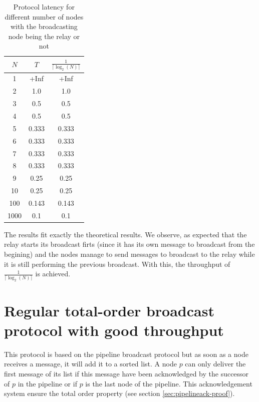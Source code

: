\documentclass[a4paper]{article}
\begin{document}
\begin{table}[H]
\centering
\begin{tabular}{|c|c|c|}
    \hline
    $N$   & $T$  & $\frac{1}{\lceil\log_2(N)\rceil}$ \\
    \hline
    1     & +Inf   & +Inf   \\
    2     & 1.0    & 1.0    \\
    3     & 0.5    & 0.5    \\
    4     & 0.5    & 0.5    \\
    5     & 0.333  & 0.333  \\
    6     & 0.333  & 0.333  \\
    7     & 0.333  & 0.333  \\
    8     & 0.333  & 0.333  \\
    9     & 0.25   & 0.25   \\
    10    & 0.25   & 0.25   \\
    100   & 0.143  & 0.143  \\
    1000  & 0.1    & 0.1    \\
    \hline
\end{tabular}
\caption{Protocol latency for different number of nodes with the broadcasting node being the relay or not}
\label{table:thr}
\end{table}

The results fit exactly the theoretical results. We observe, as expected that
the relay starts its broadcast firts (since it has its own message to
broadcast from the begining) and the nodes manage to send messages to
broadcast to the relay while it is still performing the previous broadcast.
With this, the throughput of $\frac{1}{\lceil\log_2(N)\rceil}$ is achieved.

\section{Regular total-order broadcast protocol with good throughput}
\label{sec:throughputTO}

This protocol is based on the pipeline broadcast protocol but as soon as a node
receives a message, it will add it to a sorted list. A node $p$ can only deliver the
first message of its list if this message have been acknowledged by the
successor of $p$ in the pipeline or if $p$ is the last node of the pipeline.
This acknowledgement system ensure the total order property (see section
\ref{sec:pipelineack-proof}).
\end{document}
